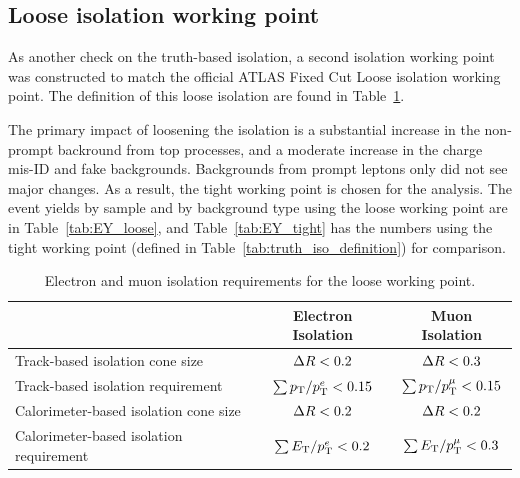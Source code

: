 \subsection{Loose isolation working point}
As another check on the truth-based isolation, a second isolation working point was constructed to match the official ATLAS Fixed Cut Loose isolation working point.
The definition of this loose isolation are found in Table~\ref{tab:isolation_cuts_loose}.

The primary impact of loosening the isolation is a substantial increase in the non-prompt backround from top processes, and a moderate increase in the charge mis-ID and fake backgrounds.
Backgrounds from prompt leptons only did not see major changes.
As a result, the tight working point is chosen for the analysis.
The event yields by sample and by background type using the loose working point are in Table~\ref{tab:EY_loose}, and Table~\ref{tab:EY_tight} has the numbers using the tight working point (defined in Table~\ref{tab:truth_iso_definition}) for comparison.

\begin{table}[htbp]\renewcommand{\arraystretch}{1.2}
  \begin{center}
  \begin{tabular}{l|c|c}
    \hline\hline
				~               &   Electron Isolation & Muon Isolation \\
\hline\hline
Track-based isolation cone size   		&   $\Delta R < 0.2$         & $\Delta R < 0.3$ \\
Track-based isolation requirement    		&   $\sum p_{\mathrm{T}}/p_{\mathrm{T}}^{e} < 0.15$ & $\sum p_{\mathrm{T}}/p_{\mathrm{T}}^{\mu} < 0.15$ \\
Calorimeter-based isolation cone size   	&   $\Delta R < 0.2$	    & $\Delta R < 0.2$\\
Calorimeter-based isolation requirement    	&   $\sum E_{\mathrm{T}}/p_{\mathrm{T}}^{e} <  0.2$ & $\sum E_{\mathrm{T}}/p_{\mathrm{T}}^{\mu} <  0.3$	\\
\hline
 \end{tabular}
  \end{center}
  \caption{Electron and muon isolation requirements for the loose working point.} 
  \label{tab:isolation_cuts_loose}
\end{table}




\FloatBarrier
